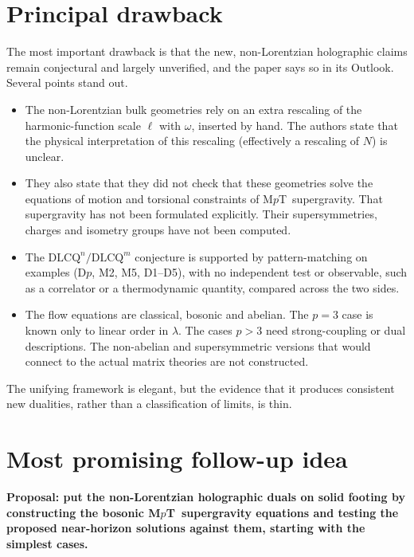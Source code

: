 \documentclass[11pt,a4paper]{article}
\newcommand{\MpT}{M$p$T}
\begin{document}
\section{Principal drawback}

The most important drawback is that the new, non-Lorentzian holographic claims remain conjectural and largely unverified, and the paper says so in its Outlook. Several points stand out.
\begin{itemize}
\item The non-Lorentzian bulk geometries rely on an extra rescaling of the harmonic-function scale $\ell$ with $\omega$, inserted by hand. The authors state that the physical interpretation of this rescaling (effectively a rescaling of $N$) is unclear.
\item They also state that they did not check that these geometries solve the equations of motion and torsional constraints of \MpT\ supergravity. That supergravity has not been formulated explicitly. Their supersymmetries, charges and isometry groups have not been computed.
\item The $\mathrm{DLCQ}^n/\mathrm{DLCQ}^m$ conjecture is supported by pattern-matching on examples (D$p$, M2, M5, D1--D5), with no independent test or observable, such as a correlator or a thermodynamic quantity, compared across the two sides.
\item The flow equations are classical, bosonic and abelian. The $p=3$ case is known only to linear order in $\lambda$. The cases $p>3$ need strong-coupling or dual descriptions. The non-abelian and supersymmetric versions that would connect to the actual matrix theories are not constructed.
\end{itemize}
The unifying framework is elegant, but the evidence that it produces consistent new dualities, rather than a classification of limits, is thin.

\section{Most promising follow-up idea}

\textbf{Proposal: put the non-Lorentzian holographic duals on solid footing by constructing the bosonic \MpT\ supergravity equations and testing the proposed near-horizon solutions against them, starting with the simplest cases.}
\end{document}

